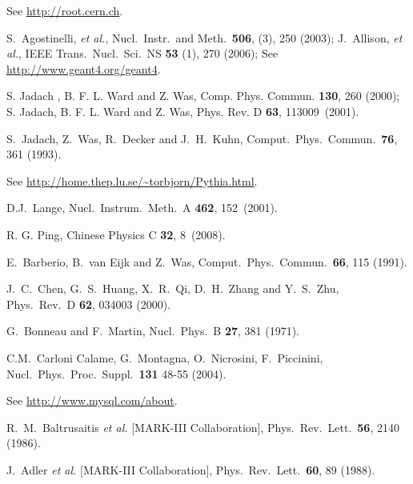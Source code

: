 \begin{thebibliography}{99}
  See \url{http://root.cern.ch}.

  S.~Agostinelli, {\it et al.}, Nucl.\ Instr.\ and Meth.\ {\bf 506}, (3), 250 (2003);
  J.~Allison, {\it et al.}, IEEE Trans.\ Nucl.\ Sci.\ NS {\bf 53} (1), 270 (2006);
  See \url{http://www.geant4.org/geant4}.

 S. Jadach , B. F. L. Ward and Z. Was,
  Comp. Phys. Commun. {\bf 130}, 260 (2000); S. Jadach, B. F. L. Ward
  and  Z. Was, Phys. Rev. D {\bf 63}, 113009~(2001).

  S.~Jadach, Z.~Was, R.~Decker and J.~H.~Kuhn,
  Comput.\ Phys.\ Commun.\  {\bf 76}, 361 (1993).

  See \url{http://home.thep.lu.se/\~torbjorn/Pythia.html}.

  D.J.~Lange,
  Nucl.\ Instrum.\ Meth.\ A {\bf 462},
  152~(2001).

  R. G. Ping, Chinese Physics C {\bf 32}, 8~(2008).

  E.~Barberio, B.~van Eijk and Z.~Was,
  Comput.\ Phys.\ Commun.\  {\bf 66}, 115 (1991).

  J.~C.~Chen, G.~S.~Huang, X.~R.~Qi, D.~H.~Zhang and Y.~S.~Zhu,
  Phys.\ Rev.\ D {\bf 62}, 034003 (2000).

  G.~Bonneau and F.~Martin,
  Nucl.\ Phys.\ B {\bf 27}, 381 (1971).

  C.M.~Carloni Calame, G.~Montagna, O.~Nicrosini, F.~Piccinini,
  Nucl.\ Phys.\ Proc.\ Suppl.\ {\bf 131} 48-55 (2004).

  See \url{http://www.mysql.com/about}.

  R.~M.~Baltrusaitis {\it et al.}  [MARK-III Collaboration],
  Phys.\ Rev.\ Lett.\  {\bf 56}, 2140 (1986).

  J.~Adler {\it et al.}  [MARK-III Collaboration],
  Phys.\ Rev.\ Lett.\  {\bf 60}, 89 (1988).



\end{thebibliography}

